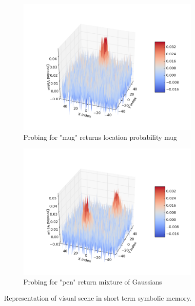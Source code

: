 \documentclass[conference]{IEEEtran}
\begin{document}
\begin{figure}[th!]
			\begin{subfigure}{0.45\columnwidth}
				\center
				\includegraphics[width=\linewidth]{img/probe_for_mug.png}
				\caption{Probing for "mug" returns location probability mug}
				\label{fig:probing-single}
			\end{subfigure}
			\begin{subfigure}{0.45\columnwidth}
				\center
				\includegraphics[width=\linewidth]{img/probe_for_pen.png}
				\caption{Probing for "pen" return mixture of Gaussians}
				\label{fig:probing-double}
			\end{subfigure}
						
		
		\caption{Representation of visual scene in short term symbolic memory. }
		
	\end{figure}
	
\end{document}
